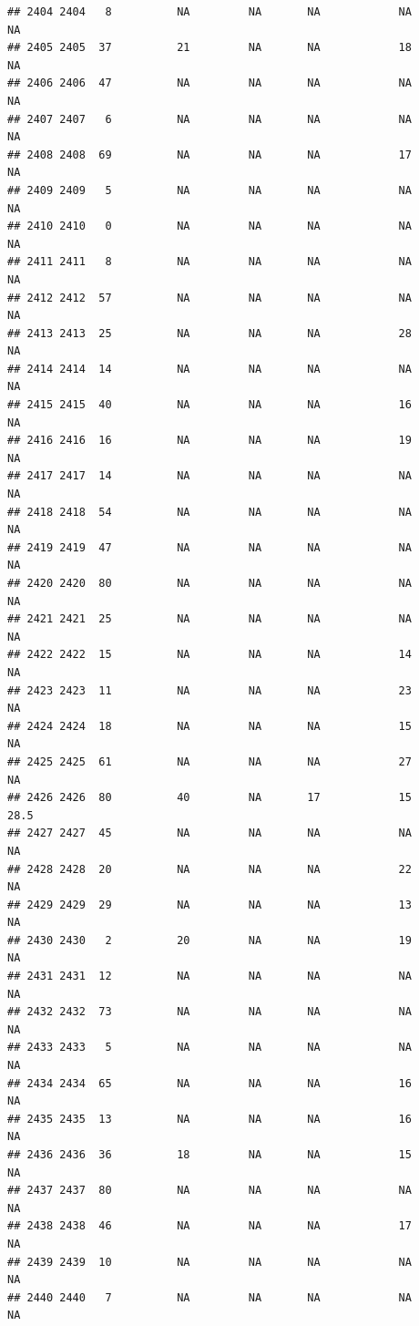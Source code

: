 \documentclass[man]{apa6}
\begin{document}
\begin{verbatim}
## 2404 2404   8          NA         NA       NA            NA       NA
## 2405 2405  37          21         NA       NA            18       NA
## 2406 2406  47          NA         NA       NA            NA       NA
## 2407 2407   6          NA         NA       NA            NA       NA
## 2408 2408  69          NA         NA       NA            17       NA
## 2409 2409   5          NA         NA       NA            NA       NA
## 2410 2410   0          NA         NA       NA            NA       NA
## 2411 2411   8          NA         NA       NA            NA       NA
## 2412 2412  57          NA         NA       NA            NA       NA
## 2413 2413  25          NA         NA       NA            28       NA
## 2414 2414  14          NA         NA       NA            NA       NA
## 2415 2415  40          NA         NA       NA            16       NA
## 2416 2416  16          NA         NA       NA            19       NA
## 2417 2417  14          NA         NA       NA            NA       NA
## 2418 2418  54          NA         NA       NA            NA       NA
## 2419 2419  47          NA         NA       NA            NA       NA
## 2420 2420  80          NA         NA       NA            NA       NA
## 2421 2421  25          NA         NA       NA            NA       NA
## 2422 2422  15          NA         NA       NA            14       NA
## 2423 2423  11          NA         NA       NA            23       NA
## 2424 2424  18          NA         NA       NA            15       NA
## 2425 2425  61          NA         NA       NA            27       NA
## 2426 2426  80          40         NA       17            15     28.5
## 2427 2427  45          NA         NA       NA            NA       NA
## 2428 2428  20          NA         NA       NA            22       NA
## 2429 2429  29          NA         NA       NA            13       NA
## 2430 2430   2          20         NA       NA            19       NA
## 2431 2431  12          NA         NA       NA            NA       NA
## 2432 2432  73          NA         NA       NA            NA       NA
## 2433 2433   5          NA         NA       NA            NA       NA
## 2434 2434  65          NA         NA       NA            16       NA
## 2435 2435  13          NA         NA       NA            16       NA
## 2436 2436  36          18         NA       NA            15       NA
## 2437 2437  80          NA         NA       NA            NA       NA
## 2438 2438  46          NA         NA       NA            17       NA
## 2439 2439  10          NA         NA       NA            NA       NA
## 2440 2440   7          NA         NA       NA            NA       NA

\end{verbatim}
\end{document}
